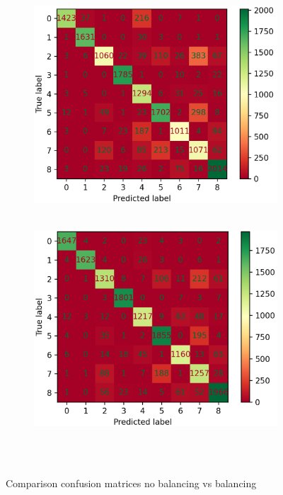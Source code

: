 \begin{figure}[ht]
	\centering
	\begin{subfigure}{0.49\columnwidth}
		\includegraphics[width=\columnwidth]{./figures/Alex_420_no_balancing_conf_matrix_cropped.png}
		~\label{fig:nobalancing}
	\end{subfigure} 
	\begin{subfigure}{0.49\columnwidth}
		\includegraphics[width=\columnwidth]{./figures/Alex_420_with_balancing_conf_matrix_cropped.png}
		~\label{fig:balancing}
	\end{subfigure}
	\caption{Comparison confusion matrices no balancing vs balancing}~\label{fig:balancingcombined}
\end{figure}


